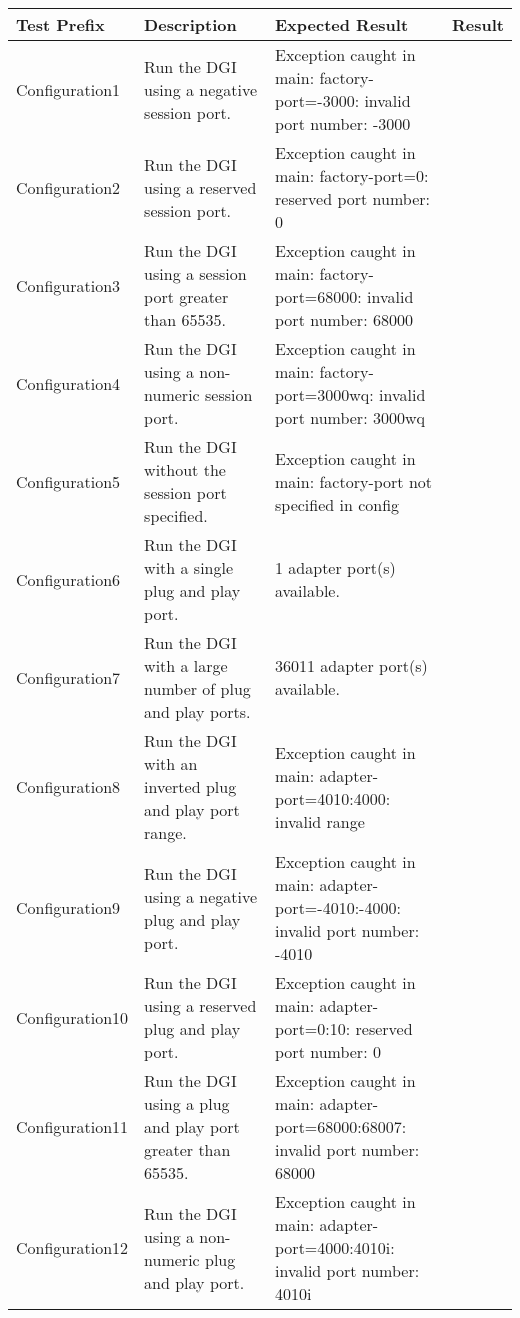 \documentclass{article}
\begin{document}
\begin{center}
\begin{footnotesize}
\begin{longtable}{|p{3cm}|p{4cm}|p{8cm}|c|}
    \hline
    Test Prefix & Description & Expected Result & Result \\ \hline \endhead \hline \endfoot
    Configuration1 & Run the DGI using a negative session port. & Exception caught in main: factory-port=-3000: invalid port number: -3000 & \\
    Configuration2 & Run the DGI using a reserved session port. & Exception caught in main: factory-port=0: reserved port number: 0 & \\
    Configuration3 & Run the DGI using a session port greater than 65535. & Exception caught in main: factory-port=68000: invalid port number: 68000 & \\
    Configuration4 & Run the DGI using a non-numeric session port. & Exception caught in main: factory-port=3000wq: invalid port number: 3000wq & \\
    Configuration5 & Run the DGI without the session port specified. & Exception caught in main: factory-port not specified in config & \\
    Configuration6 & Run the DGI with a single plug and play port. & 1 adapter port(s) available. & \\
    Configuration7 & Run the DGI with a large number of plug and play ports. & 36011 adapter port(s) available. & \\
    Configuration8 & Run the DGI with an inverted plug and play port range. & Exception caught in main: adapter-port=4010:4000: invalid range & \\
    Configuration9 & Run the DGI using a negative plug and play port. & Exception caught in main: adapter-port=-4010:-4000: invalid port number: -4010 & \\
    Configuration10 & Run the DGI using a reserved plug and play port. & Exception caught in main: adapter-port=0:10: reserved port number: 0 & \\
    Configuration11 & Run the DGI using a plug and play port greater than 65535. & Exception caught in main: adapter-port=68000:68007: invalid port number: 68000 & \\
    Configuration12 & Run the DGI using a non-numeric plug and play port. & Exception caught in main: adapter-port=4000:4010i: invalid port number: 4010i & \\

\end{longtable}
\end{footnotesize}
\end{center}
\end{document}
